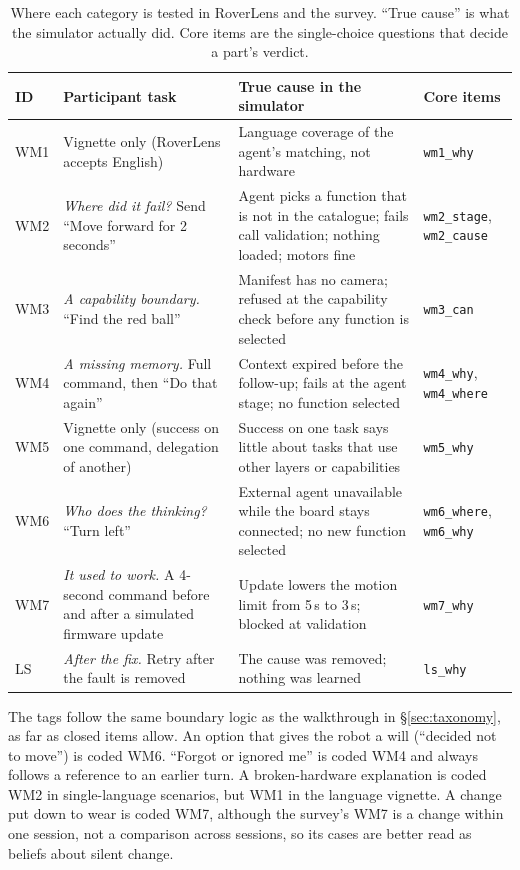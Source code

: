\documentclass[sigconf]{acmart}
\begin{document}
\begin{table}[t]
  \caption{Where each category is tested in RoverLens and the survey. ``True cause'' is what the simulator actually did. Core items are the single-choice questions that decide a part's verdict.}
  \label{tab:wm-survey}
  \small
  \begin{tabular}{@{}p{0.9cm}p{4.2cm}p{5.4cm}p{3.6cm}@{}}
    \toprule
    ID & Participant task & True cause in the simulator & Core items \\
    \midrule
    WM1 & Vignette only (RoverLens accepts English) & Language coverage of the agent's matching, not hardware & \texttt{wm1\_why} \\
    WM2 & \emph{Where did it fail?} Send ``Move forward for 2 seconds'' & Agent picks a function that is not in the catalogue; fails call validation; nothing loaded; motors fine & \texttt{wm2\_stage}, \texttt{wm2\_cause} \\
    WM3 & \emph{A capability boundary.} ``Find the red ball'' & Manifest has no camera; refused at the capability check before any function is selected & \texttt{wm3\_can} \\
    WM4 & \emph{A missing memory.} Full command, then ``Do that again'' & Context expired before the follow-up; fails at the agent stage; no function selected & \texttt{wm4\_why}, \texttt{wm4\_where} \\
    WM5 & Vignette only (success on one command, delegation of another) & Success on one task says little about tasks that use other layers or capabilities & \texttt{wm5\_why} \\
    WM6 & \emph{Who does the thinking?} ``Turn left'' & External agent unavailable while the board stays connected; no new function selected & \texttt{wm6\_where}, \texttt{wm6\_why} \\
    WM7 & \emph{It used to work.} A 4-second command before and after a simulated firmware update & Update lowers the motion limit from 5\,s to 3\,s; blocked at validation & \texttt{wm7\_why} \\
    LS & \emph{After the fix.} Retry after the fault is removed & The cause was removed; nothing was learned & \texttt{ls\_why} \\
    \bottomrule
  \end{tabular}
\end{table}

The tags follow the same boundary logic as the walkthrough in \S\ref{sec:taxonomy}, as far as closed items allow. An option that gives the robot a will (``decided not to move'') is coded WM6. ``Forgot or ignored me'' is coded WM4 and always follows a reference to an earlier turn. A broken-hardware explanation is coded WM2 in single-language scenarios, but WM1 in the language vignette. A change put down to wear is coded WM7, although the survey's WM7 is a change within one session, not a comparison across sessions, so its cases are better read as beliefs about silent change.
\end{document}
